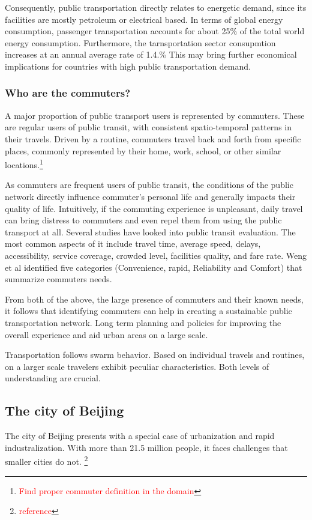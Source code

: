 \documentclass{article}
\newcommand{\selfnote}[1]{\footnote{\textcolor{red}{#1}}}
\begin{document}
Consequently, public transportation directly relates to energetic demand, since its facilities are mostly petroleum or electrical based. In terms of global energy consumption, passenger transportation accounts for about 25\% of the total world energy consumption. Furthermore, the tarnsportation sector consupmtion increases at an annual average rate of 1.4.\% \cite{eia2016energy} This may bring further economical implications for countries with high public transportation demand.

\subsubsection{Who are the commuters?}
A major proportion of public transport users is represented by commuters. These are regular users of public transit, with consistent spatio-temporal patterns in their travels. Driven by a routine, commuters travel back and forth from specific places, commonly represented by their home, work, school, or other similar locations.\selfnote{Find proper commuter definition in the domain}

As commuters are frequent users of public transit, the  conditions of the public network directly influence commuter's personal life and generally impacts their quality of life. Intuitively, if the commuting experience is unpleasant, daily travel can bring distress to commuters and even repel them from using the public transport at all. Several studies have looked into public transit evaluation. The most common aspects of it include travel time, average speed, delays, accessibility, service coverage, crowded level, facilities quality, and fare rate. Weng et al \cite{weng2013bus} identified five categories (Convenience, rapid, Reliability and Comfort) that summarize commuters needs.
 
From both of the above, the large presence of commuters and their known needs, it follows that identifying commuters can help in creating a sustainable public transportation network. Long term planning and policies for improving the overall experience and aid urban areas on a large scale.

Transportation follows swarm behavior. Based on individual travels and routines, on a larger scale travelers exhibit peculiar characteristics. Both levels of understanding are crucial.   

\subsection{The city of Beijing}
The city of Beijing presents with a special case of urbanization and rapid industralization. With more than 21.5 million people, it faces challenges that smaller cities do not. \selfnote{reference}
\end{document}
